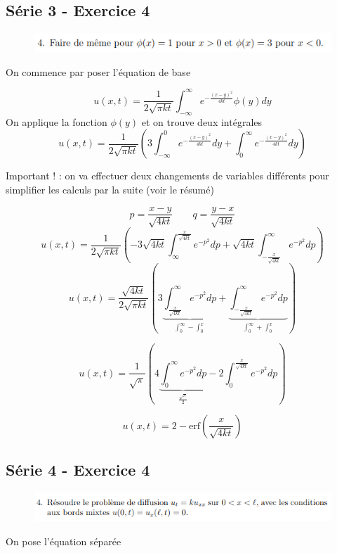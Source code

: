 \documentclass[resume]{subfiles}
\begin{document}
\begin{multicols}{2}
\subsection{Série 3 - Exercice 4}
\label{S3E4}
\begin{figure}[H]
\centering
\includegraphics[scale=0.5]{img_11.png}
\end{figure}

On commence par poser l'équation de base

$$u(x,t)=\frac{1}{2\sqrt{\pi kt}}\int_{-\infty}^{\infty}e^{-\frac{(x-y)^2}{4kt}}\phi(y)dy$$
On applique la fonction $\phi(y)$ et on trouve deux intégrales
$$u(x,t)=\frac{1}{2\sqrt{\pi kt}}\left(3\int_{-\infty}^{0}e^{-\frac{(x-y)^2}{4kt}}dy+\int_{0}^{\infty}e^{-\frac{(x-y)^2}{4kt}}dy\right)$$
\begin{mdframed}[linewidth=2pt,linecolor=OrangeRed!50!White]Important ! : on va effectuer deux changements de variables différents pour simplifier les calculs par la suite (voir le résumé)
\end{mdframed}
$$p=\frac{x-y}{\sqrt{4kt}}\qquad q=\frac{y-x}{\sqrt{4kt}}$$
$$u(x,t)=\frac{1}{2\sqrt{\pi kt}}\left(-3\sqrt{4kt}\int_{\infty}^{\frac{x}{\sqrt{4kt}}}e^{-p^2}dp+\sqrt{4kt}\int_{-\frac{x}{\sqrt{4kt}}}^{\infty}e^{-p^2}dp\right)$$
$$u(x,t)=\frac{\sqrt{4kt}}{2\sqrt{\pi kt}}\left(3\underbrace{\int_{\frac{x}{\sqrt{4kt}}}^{\infty}e^{-p^2}dp}_{\int_0^{\infty}-\int_0^{x}}+\underbrace{\int_{-\frac{x}{\sqrt{4kt}}}^{\infty}e^{-p^2}dp}_{\int_0^{\infty}+\int_0^{x}}\right)$$

$$u(x,t)=\frac{1}{\sqrt{\pi}}\left(4\underbrace{\int_0^{\infty}e^{-p^2}dp}_{\frac{\sqrt{\pi}}{2}}-2\int_0^{\frac{x}{\sqrt{4kt}}}e^{-p^2}dp\right)$$

$$\boxed{u(x,t)=2-\text{erf}\left(\frac{x}{\sqrt{4kt}}\right)}$$
\subsection{Série 4 - Exercice 4}
\label{S4E4}
\begin{figure}[H]
\centering
\includegraphics[scale=0.5]{img_12.png}
\end{figure}
On pose l'équation séparée


\end{multicols}
\end{document}
